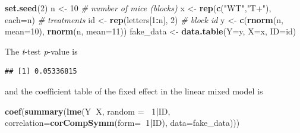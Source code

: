 \documentclass[]{book}
\newenvironment{Shaded}{\begin{snugshade}}{\end{snugshade}}
\newcommand{\KeywordTok}[1]{\textcolor[rgb]{0.13,0.29,0.53}{\textbf{#1}}}
\newcommand{\DataTypeTok}[1]{\textcolor[rgb]{0.13,0.29,0.53}{#1}}
\newcommand{\DecValTok}[1]{\textcolor[rgb]{0.00,0.00,0.81}{#1}}
\newcommand{\StringTok}[1]{\textcolor[rgb]{0.31,0.60,0.02}{#1}}
\newcommand{\CommentTok}[1]{\textcolor[rgb]{0.56,0.35,0.01}{\textit{#1}}}
\newcommand{\OtherTok}[1]{\textcolor[rgb]{0.56,0.35,0.01}{#1}}
\newcommand{\OperatorTok}[1]{\textcolor[rgb]{0.81,0.36,0.00}{\textbf{#1}}}
\newcommand{\NormalTok}[1]{#1}
\begin{document}
\begin{Shaded}
\begin{Highlighting}[]
\KeywordTok{set.seed}\NormalTok{(}\DecValTok{2}\NormalTok{)}
\NormalTok{n <-}\StringTok{ }\DecValTok{10} \CommentTok{# number of mice (blocks)}
\NormalTok{x <-}\StringTok{ }\KeywordTok{rep}\NormalTok{(}\KeywordTok{c}\NormalTok{(}\StringTok{"WT"}\NormalTok{,}\StringTok{"T+"}\NormalTok{), }\DataTypeTok{each=}\NormalTok{n) }\CommentTok{# treatments}
\NormalTok{id <-}\StringTok{ }\KeywordTok{rep}\NormalTok{(letters[}\DecValTok{1}\OperatorTok{:}\NormalTok{n], }\DecValTok{2}\NormalTok{) }\CommentTok{# block id}
\NormalTok{y <-}\StringTok{ }\KeywordTok{c}\NormalTok{(}\KeywordTok{rnorm}\NormalTok{(n, }\DataTypeTok{mean=}\DecValTok{10}\NormalTok{), }\KeywordTok{rnorm}\NormalTok{(n, }\DataTypeTok{mean=}\DecValTok{11}\NormalTok{))}
\NormalTok{fake_data <-}\StringTok{ }\KeywordTok{data.table}\NormalTok{(}\DataTypeTok{Y=}\NormalTok{y, }\DataTypeTok{X=}\NormalTok{x, }\DataTypeTok{ID=}\NormalTok{id)}
\end{Highlighting}
\end{Shaded}

The \emph{t}-test \emph{p}-value is

\begin{Shaded}
\end{Shaded}

\begin{verbatim}
## [1] 0.05336815
\end{verbatim}

and the coefficient table of the fixed effect in the linear mixed model
is

\begin{Shaded}
\begin{Highlighting}[]
\KeywordTok{coef}\NormalTok{(}\KeywordTok{summary}\NormalTok{(}\KeywordTok{lme}\NormalTok{(Y}\OperatorTok{~}\NormalTok{X, }\DataTypeTok{random =} \OperatorTok{~}\DecValTok{1}\OperatorTok{|}\NormalTok{ID, }\DataTypeTok{correlation=}\KeywordTok{corCompSymm}\NormalTok{(}\DataTypeTok{form=}\OperatorTok{~}\DecValTok{1}\OperatorTok{|}\NormalTok{ID), }\DataTypeTok{data=}\NormalTok{fake_data)))}
\end{Highlighting}
\end{Shaded}
\end{document}
